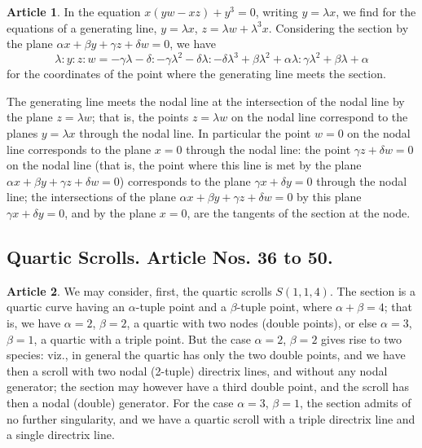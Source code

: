 \documentclass[12pt,a4paper]{article}
\theoremstyle{definition}
\newtheorem{art}{Article}[section]
\begin{document}
\begin{art}
In the equation $x(yw - xz) + y^3 = 0$, writing $y = \lambda x$, we find for the equations of a generating line, $y = \lambda x$, $z = \lambda w + \lambda^3 x$. Considering the section by the plane $\alpha x + \beta y + \gamma z + \delta w = 0$, we have
\[
\lambda : y : z : w = -\gamma \lambda - \delta : -\gamma \lambda^2 - \delta \lambda : -\delta \lambda^3 + \beta \lambda^2 + \alpha \lambda : \gamma \lambda^2 + \beta \lambda + \alpha
\]
for the coordinates of the point where the generating line meets the section.

The generating line meets the nodal line at the intersection of the nodal line by the plane $z = \lambda w$; that is, the points $z = \lambda w$ on the nodal line correspond to the planes $y = \lambda x$ through the nodal line. In particular the point $w = 0$ on the nodal line corresponds to the plane $x = 0$ through the nodal line: the point $\gamma z + \delta w = 0$ on the nodal line (that is, the point where this line is met by the plane $\alpha x + \beta y + \gamma z + \delta w = 0$) corresponds to the plane $\gamma x + \delta y = 0$ through the nodal line; the intersections of the plane $\alpha x + \beta y + \gamma z + \delta w = 0$ by this plane $\gamma x + \delta y = 0$, and by the plane $x = 0$, are the tangents of the section at the node.
\end{art}

\subsection*{Quartic Scrolls. Article Nos. 36 to 50.}

\begin{art}
We may consider, first, the quartic scrolls $S(1, 1, 4)$. The section is a quartic curve having an $\alpha$-tuple point and a $\beta$-tuple point, where $\alpha + \beta = 4$; that is, we have $\alpha = 2$, $\beta = 2$, a quartic with two nodes (double points), or else $\alpha = 3$, $\beta = 1$, a quartic with a triple point. But the case $\alpha = 2$, $\beta = 2$ gives rise to two species: viz., in general the quartic has only the two double points, and we have then a scroll with two nodal (2-tuple) directrix lines, and without any nodal generator; the section may however have a third double point, and the scroll has then a nodal (double) generator. For the case $\alpha = 3$, $\beta = 1$, the section admits of no further singularity, and we have a quartic scroll with a triple directrix line and a single directrix line.
\end{art}
\end{document}
